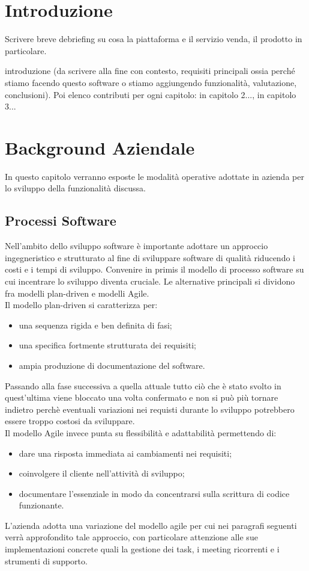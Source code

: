 \documentclass[target=bach,aauheader=,style=]{thud}
\begin{document}
\chapter{Introduzione}

Scrivere breve debriefing su cosa la piattaforma e il servizio venda, il prodotto in particolare.

introduzione (da scrivere alla fine con contesto, requisiti principali ossia perché stiamo facendo questo software o
stiamo aggiungendo funzionalità, valutazione, conclusioni). Poi elenco contributi per ogni capitolo:
in capitolo 2..., in capitolo 3...


\chapter{Background Aziendale}

In questo capitolo verranno esposte le modalità operative adottate in azienda per lo sviluppo della funzionalità discussa.
\section{Processi Software}
Nell'ambito dello sviluppo software è importante adottare un approccio ingegneristico e strutturato al fine di sviluppare software di
qualità riducendo i costi e i tempi di sviluppo. Convenire in primis il modello di processo software su cui incentrare lo
sviluppo diventa cruciale. Le alternative principali si dividono fra modelli plan-driven e modelli Agile.\\
Il modello plan-driven si caratterizza per:
\begin{itemize}
    \item una sequenza rigida e ben definita di fasi;
    \item una specifica fortmente strutturata dei requisiti;
    \item ampia produzione di documentazione del software.
\end{itemize}
Passando alla fase successiva a quella attuale tutto ciò che è stato svolto in quest'ultima viene bloccato una volta confermato
e non si può più tornare indietro perchè eventuali variazioni nei requisti durante lo sviluppo potrebbero essere troppo costosi
da sviluppare.\\ Il modello Agile invece punta su flessibilità e adattabilità permettendo di:
\begin{itemize}
    \item dare una risposta immediata ai cambiamenti nei requisiti;
    \item coinvolgere il cliente nell'attività di sviluppo;
    \item documentare l'essenziale in modo da concentrarsi sulla scrittura di codice funzionante.
\end{itemize}
L'azienda adotta una variazione del modello agile per cui nei paragrafi seguenti verrà approfondito tale approccio,
con particolare attenzione alle sue implementazioni concrete quali la gestione dei task, i meeting ricorrenti e i strumenti
di supporto.
\end{document}
